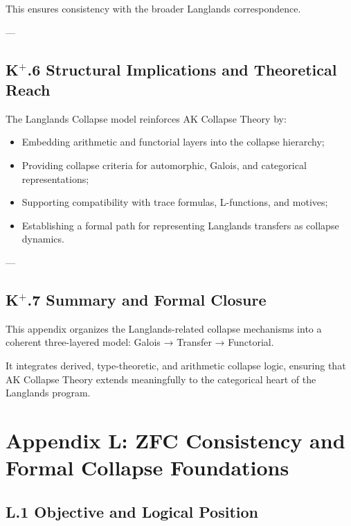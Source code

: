 \documentclass[11pt]{article}
\begin{document}
This ensures consistency with the broader Langlands correspondence.

---

\subsection*{K$^{+}$.6 Structural Implications and Theoretical Reach}

The Langlands Collapse model reinforces AK Collapse Theory by:

\begin{itemize}
    \item Embedding arithmetic and functorial layers into the collapse hierarchy;
    \item Providing collapse criteria for automorphic, Galois, and categorical representations;
    \item Supporting compatibility with trace formulas, L-functions, and motives;
    \item Establishing a formal path for representing Langlands transfers as collapse dynamics.
\end{itemize}

---

\subsection*{K$^{+}$.7 Summary and Formal Closure}

This appendix organizes the Langlands-related collapse mechanisms into a coherent three-layered model: Galois → Transfer → Functorial.

It integrates derived, type-theoretic, and arithmetic collapse logic, ensuring that AK Collapse Theory extends meaningfully to the categorical heart of the Langlands program.



\section*{Appendix L: ZFC Consistency and Formal Collapse Foundations}

\subsection*{L.1 Objective and Logical Position}
\end{document}
